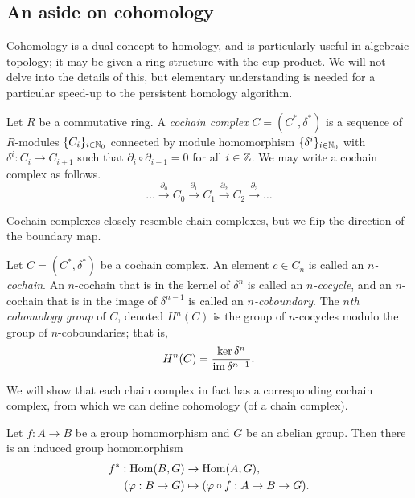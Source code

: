 \subsection{An aside on cohomology}

Cohomology is a dual concept to homology, and is particularly useful in algebraic topology; it may be given a ring structure with the cup product. We will not delve into the details of this, but elementary understanding is needed for a particular speed-up to the persistent homology algorithm. 

\begin{definition}
    Let $R$ be a commutative ring. A \emph{cochain complex} $C = (C^*, \delta^*)$ is a sequence of $R$-modules $\{C_i\}_{i \in \mathbb N_0}$ connected by module homomorphism $\{\delta^i\}_{i \in \mathbb N_0}$ with $\delta^i: C_i \to C_{i+1}$ such that $\partial_i \circ \partial_{i-1} = 0$ for all $i \in \mathbb Z$. We may write a cochain complex as follows.
    \[ \ldots \xrightarrow{\partial_0} C_0 \xrightarrow{\partial_1} C_1 \xrightarrow{\partial_2} C_2 \xrightarrow{\partial_3} \ldots \]
\end{definition}

Cochain complexes closely resemble chain complexes, but we flip the direction of the boundary map. 

\begin{definition}
    Let $C = (C^*, \delta^*)$ be a cochain complex. An element $c \in C_n$ is called an \emph{$n$-cochain}. An $n$-cochain that is in the kernel of $\delta^n$ is called an \emph{$n$-cocycle}, and an $n$-cochain that is in the image of $\delta^{n-1}$ is called an \emph{$n$-coboundary}. The \emph{$n$th cohomology group} of $C$, denoted $H^n(C)$ is the group of $n$-cocycles modulo the group of $n$-coboundaries; that is,
    \[ H^n(C) = \frac{\ker{\delta^n}}{\operatorname{im}{\delta^{n-1}}}. \]
\end{definition}

We will show that each chain complex in fact has a corresponding cochain complex, from which we can define cohomology (of a chain complex).

Let $f: A \to B$ be a group homomorphism and $G$ be an abelian group. Then there is an induced group homomorphism
\begin{align*}
    f^*: \operatorname{Hom}(B, G)    & \to \operatorname{Hom}(A, G),                           \\
    (\varphi: B \to G) & \mapsto (\varphi \circ f: A \to B \to G).
\end{align*}


